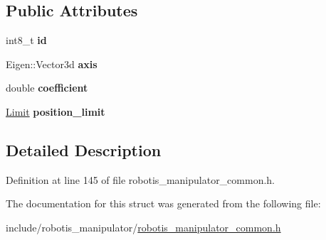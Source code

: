\subsection*{Public Attributes}
\begin{DoxyCompactItemize}
\item 
int8\+\_\+t {\bfseries id}\hypertarget{structrobotis__manipulator_1_1___joint_constant_a824dd1d0e06e936291c6e6c7017d8775}{}\label{structrobotis__manipulator_1_1___joint_constant_a824dd1d0e06e936291c6e6c7017d8775}

\item 
Eigen\+::\+Vector3d {\bfseries axis}\hypertarget{structrobotis__manipulator_1_1___joint_constant_a94174bf2223fcd31b8a48d239e711742}{}\label{structrobotis__manipulator_1_1___joint_constant_a94174bf2223fcd31b8a48d239e711742}

\item 
double {\bfseries coefficient}\hypertarget{structrobotis__manipulator_1_1___joint_constant_a45b6f0ce02f71fed0824698a32fbd32f}{}\label{structrobotis__manipulator_1_1___joint_constant_a45b6f0ce02f71fed0824698a32fbd32f}

\item 
\hyperlink{structrobotis__manipulator_1_1___limit}{Limit} {\bfseries position\+\_\+limit}\hypertarget{structrobotis__manipulator_1_1___joint_constant_a10abca305d9ad09b734abe0b6860aed6}{}\label{structrobotis__manipulator_1_1___joint_constant_a10abca305d9ad09b734abe0b6860aed6}

\end{DoxyCompactItemize}


\subsection{Detailed Description}


Definition at line 145 of file robotis\+\_\+manipulator\+\_\+common.\+h.



The documentation for this struct was generated from the following file\+:\begin{DoxyCompactItemize}
\item 
include/robotis\+\_\+manipulator/\hyperlink{robotis__manipulator__common_8h}{robotis\+\_\+manipulator\+\_\+common.\+h}\end{DoxyCompactItemize}
